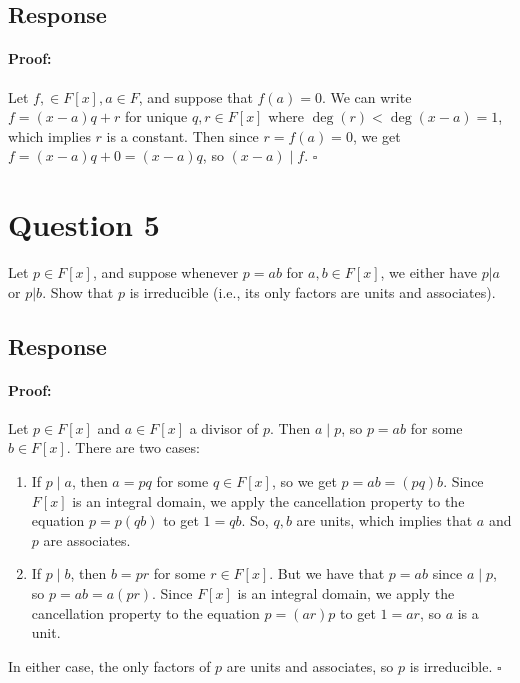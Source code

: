 \documentclass [12pt] {article}
\newenvironment{proof}{\paragraph{Proof:}}{\hfill$\square$}
\begin{document}
\subsection*{Response}
\begin{proof}
    Let $f, \in F[x], a \in F$, and suppose that $f(a) = 0$. We can write $f = (x - a)q + r$
    for unique $q, r \in F[x]$ where $\deg(r) < \deg(x - a) = 1$, which implies $r$ is a constant.
    Then since $r = f(a) = 0$, we get $f = (x - a)q + 0 = (x - a)q$, so $(x - a) \mid f$.
\end{proof}
\newpage

\section*{Question 5}
Let $p\in F[x]$, and suppose whenever $p=ab$ for $a,b\in F[x]$, we either have $p|a$ or $p|b$. Show
that $p$ is irreducible (i.e., its only factors are units and associates).

\subsection*{Response}
\begin{proof}
    Let $p \in F[x]$ and $a \in F[x]$ a divisor of $p$. Then $a \mid p$, so $p = ab$ for some
    $b \in F[x]$. There are two cases:
    \begin{enumerate}[label=\textbf{Case \arabic*:}, leftmargin=*]
        \item If $p \mid a$, then $a = pq$ for some $q \in F[x]$, so we get $p = ab = (pq)b$. Since
            $F[x]$ is an integral domain, we apply the cancellation property to the equation
            $p = p(qb)$ to get $1 = qb$. So, $q, b$ are units, which implies that $a$ and $p$ are
            associates.
        \item If $p \mid b$, then $b = pr$ for some $r \in F[x]$. But we have that $p = ab$ since
            $a \mid p$, so $p = ab = a(pr)$. Since $F[x]$ is an integral domain, we apply the
            cancellation property to the equation $p = (ar)p$ to get $1 = ar$, so $a$ is a unit.
    \end{enumerate}
    In either case, the only factors of $p$ are units and associates, so $p$ is irreducible.
\end{proof}
\newpage
\end{document}
